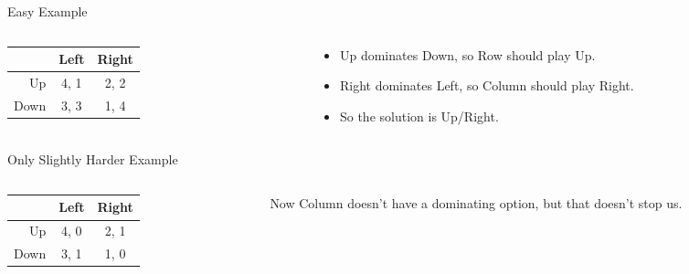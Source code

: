 \documentclass[
  14pt,
  letterpaper,
  ignorenonframetext,
  aspectratio=169,
  handout]{beamer}
\providecommand{\tightlist}{%
  \setlength{\itemsep}{0pt}\setlength{\parskip}{0pt}}\usepackage{longtable,booktabs,array}
\let\olditem\item
\renewcommand{\item}{%
\olditem\vspace{6pt}}
\begin{document}
\begin{frame}{Easy Example}
\protect\hypertarget{easy-example-1}{}
\begin{columns}[T]
\begin{column}{0.4\textwidth}
\begin{table}[!h]
\centering
\begin{tabular}[t]{>{}r|cc}
\toprule
 & Left & Right\\
\midrule
Up & 4, 1 & 2, 2\\
Down & 3, 3 & 1, 4\\
\bottomrule
\end{tabular}
\end{table}
\end{column}

\begin{column}{0.6\textwidth}
\begin{itemize}[<+->]
\tightlist
\item
  Up dominates Down, so Row should play Up.
\item
  Right dominates Left, so Column should play Right.
\item
  So the solution is Up/Right.
\end{itemize}
\end{column}
\end{columns}
\end{frame}

\begin{frame}{Only Slightly Harder Example}
\protect\hypertarget{only-slightly-harder-example}{}
\begin{columns}[T]
\begin{column}{0.4\textwidth}
\begin{table}[!h]
\centering
\begin{tabular}[t]{>{}r|cc}
\toprule
 & Left & Right\\
\midrule
Up & 4, 0 & 2, 1\\
Down & 3, 1 & 1, 0\\
\bottomrule
\end{tabular}
\end{table}
\end{column}

\begin{column}{0.6\textwidth}
Now Column doesn't have a dominating option, but that doesn't stop us.
\end{column}
\end{columns}
\end{frame}
\end{document}
